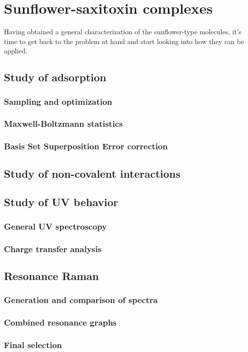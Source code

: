 \setchapterpreamble[u]{\margintoc}
\chapter{Sunflower-saxitoxin complexes}

Having obtained a general characterization of the sunflower-type molecules, it's time to get back to the problem at hand and start looking into how they can be applied.

\section{Study of adsorption}
\blindtext
\subsection{Sampling and optimization}
\blindtext
\subsection{Maxwell-Boltzmann statistics}
\blindtext
\subsection{Basis Set Superposition Error correction}
\blindtext

\section{Study of non-covalent interactions}
\blindtext

\section{Study of UV behavior}
\blindtext
\subsection{General UV spectroscopy}
\blindtext
\subsection{Charge transfer analysis}
\blindtext

\section{Resonance Raman}
\blindtext
\subsection{Generation and comparison of spectra}
\blindtext
\subsection{Combined resonance graphs}
\blindtext
\subsection{Final selection}
\blindtext
